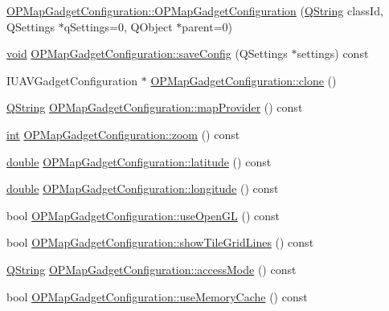 \begin{DoxyCompactItemize}
\item 
\hyperlink{group___o_p_map_plugin_gad087f5e0479a0571692363c3771744be}{O\-P\-Map\-Gadget\-Configuration\-::\-O\-P\-Map\-Gadget\-Configuration} (\hyperlink{group___u_a_v_objects_plugin_gab9d252f49c333c94a72f97ce3105a32d}{Q\-String} class\-Id, Q\-Settings $\ast$q\-Settings=0, Q\-Object $\ast$parent=0)
\item 
\hyperlink{group___u_a_v_objects_plugin_ga444cf2ff3f0ecbe028adce838d373f5c}{void} \hyperlink{group___o_p_map_plugin_ga6bbc8206c2e47f0a2fbee16ae3714fb1}{O\-P\-Map\-Gadget\-Configuration\-::save\-Config} (Q\-Settings $\ast$settings) const 
\item 
I\-U\-A\-V\-Gadget\-Configuration $\ast$ \hyperlink{group___o_p_map_plugin_gad04d5a814a94033d32e4bbb42321c105}{O\-P\-Map\-Gadget\-Configuration\-::clone} ()
\item 
\hyperlink{group___u_a_v_objects_plugin_gab9d252f49c333c94a72f97ce3105a32d}{Q\-String} \hyperlink{group___o_p_map_plugin_ga377c1d600009ec04bfa92e3a259c7071}{O\-P\-Map\-Gadget\-Configuration\-::map\-Provider} () const 
\item 
\hyperlink{ioapi_8h_a787fa3cf048117ba7123753c1e74fcd6}{int} \hyperlink{group___o_p_map_plugin_ga0e5e3cbf297d14ff236edcf0ce5f4c8f}{O\-P\-Map\-Gadget\-Configuration\-::zoom} () const 
\item 
\hyperlink{_super_l_u_support_8h_a8956b2b9f49bf918deed98379d159ca7}{double} \hyperlink{group___o_p_map_plugin_gaa2e49a8d2ff144343b4467f078374b0a}{O\-P\-Map\-Gadget\-Configuration\-::latitude} () const 
\item 
\hyperlink{_super_l_u_support_8h_a8956b2b9f49bf918deed98379d159ca7}{double} \hyperlink{group___o_p_map_plugin_ga3faeb4ba6e69dd97e9f8451b35e47c7e}{O\-P\-Map\-Gadget\-Configuration\-::longitude} () const 
\item 
bool \hyperlink{group___o_p_map_plugin_ga1b6fe88d155611b041e3e1e9213f1ab5}{O\-P\-Map\-Gadget\-Configuration\-::use\-Open\-G\-L} () const 
\item 
bool \hyperlink{group___o_p_map_plugin_ga6bea5e6009e16f4a53c4e235dfd1594b}{O\-P\-Map\-Gadget\-Configuration\-::show\-Tile\-Grid\-Lines} () const 
\item 
\hyperlink{group___u_a_v_objects_plugin_gab9d252f49c333c94a72f97ce3105a32d}{Q\-String} \hyperlink{group___o_p_map_plugin_ga2a0ae25b0c5f6fb24f2b2f791a9fe997}{O\-P\-Map\-Gadget\-Configuration\-::access\-Mode} () const 
\item 
bool \hyperlink{group___o_p_map_plugin_gae363a6d1100a72e8a2089d08c192bb87}{O\-P\-Map\-Gadget\-Configuration\-::use\-Memory\-Cache} () const 

\end{DoxyCompactItemize}
